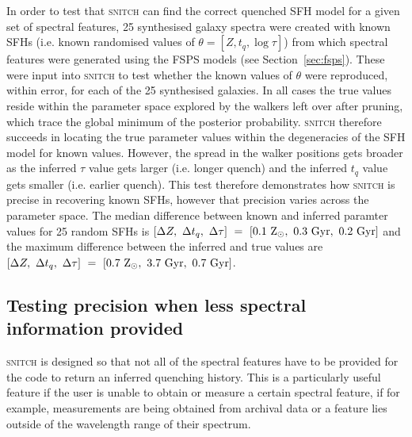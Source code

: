 \documentclass[useAMS,usenatbib]{mn2e}
\begin{document}
In order to test that \textsc{snitch} can find the correct quenched SFH model for a given set of spectral features, 25 synthesised galaxy spectra were created with known SFHs (i.e. known randomised values of $\theta = [Z, t_q, \log \tau]$) from which spectral features were generated using the FSPS models (see Section~\ref{sec:fsps}). These were input into \textsc{snitch} to test whether the known values of $\theta$ were reproduced, within error, for each of the 25 synthesised galaxies. %
In all cases the true values reside within the parameter space explored by the walkers left over after pruning, which trace the global minimum of the posterior probability. \textsc{snitch} therefore succeeds in locating the true parameter values within the degeneracies of the SFH model for known values. However, the spread in the walker positions gets broader as the inferred $\tau$ value gets larger (i.e. longer quench) and the inferred $t_q$ value gets smaller (i.e. earlier quench).  This test therefore demonstrates how \textsc{snitch} is precise in recovering known SFHs, however that precision varies across the parameter space. The median difference between known and inferred paramter values for 25 random SFHs is $[\Delta Z,~\Delta t_q,~\Delta \tau]~=~[0.1~\rm{Z}_{\odot},~0.3~\rm{Gyr},~0.2~\rm{Gyr}]$ and the maximum difference between the inferred and true values are $[\Delta Z,~\Delta t_q,~\Delta \tau]~=~[0.7~\rm{Z}_{\odot},~3.7~\rm{Gyr},~0.7~\rm{Gyr}]$.


\subsection{Testing precision when less spectral information provided}\label{sec:missingtest}



\textsc{snitch} is designed so that not all of the spectral features have to be provided for the code to return an inferred quenching history. This is a particularly useful feature if the user is unable to obtain or measure a certain spectral feature, if for example, measurements are being obtained from archival data or a feature lies outside of the wavelength range of their spectrum. 
\end{document}
